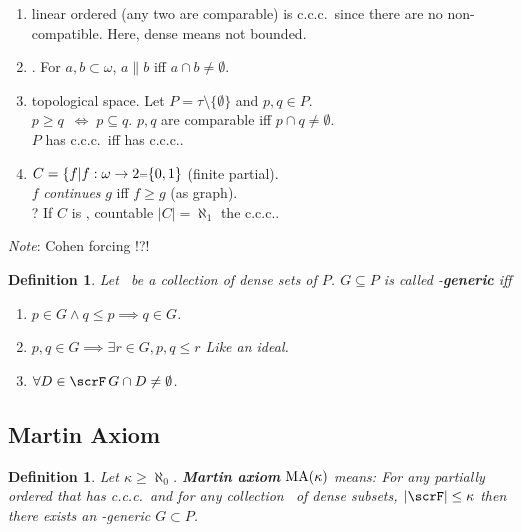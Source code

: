 \documentclass[11pt,pdftex,twoside,a4paper]{article}
\newcommand{\B}[1]{\textbf{#1}}
\newcommand{\MA}{\ensuremath{\mathop{\rm MA}\nolimits}}
\newcommand{\ccc}{c.c.c.}
\newtheorem{ldef}[thm]{Definition}
\begin{document}
\begin{enumerate}
\item {} linear ordered (any two are comparable)
is \ccc\ since there are no non-compatible.
Here, dense means not bounded.

\item {}. %
For \(a,b\subset \omega\), \(a\|b\) iff \(a\cap b \neq \emptyset\).

\item {} topological space.
Let \(P = \tau \setminus \{\emptyset\}\) and \(p,q \in P\).\\
\(p \geq q\ \;\iff\; p \subseteq q\).
\(p,q\) are comparable iff \(p\cap q\neq \emptyset\).\\
$P$ has \ccc\ iff  has \ccc.

\item \(C = \{f| f: \omega \to 2 \mathsmaller=\{0,1\}\)
(finite partial).\\
$f$ \emph{continues} $g$ iff  \(f \geq g\) (as graph).\\
? If $C$ is , countable \(|C| = \aleph_1\) the \ccc.
\end{enumerate}

\emph{Note}: Cohen forcing !?!

\begin{ldef}
Let \scrF\ be a collection of dense sets of $P$.
\(G \subseteq P\) is called \scrF-\B{generic} iff 
\begin{enumerate}
\item \(p\in G \land q\leq p \implies q \in G\).
\item \(p,q \in G \implies \exists r\in G, p,q\leq r\) Like an ideal.
\item \(\forall D \in \scrF\, G\cap D \neq \emptyset\).
\end{enumerate}
\end{ldef}

\subsection{Martin Axiom}

\begin{ldef}
Let \(\kappa \geq \aleph_0\).
\B{Martin axiom} \(\MA(\kappa)\) means:
For any partially ordered  that has \ccc\
and for any collection \scrF\ of dense subsets, \(|\scrF| \leq \kappa\)
then there exists an \scrF-generic \(G\subset P\).
\end{ldef}
\end{document}
